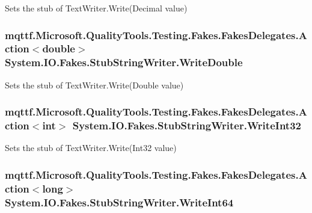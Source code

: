 Sets the stub of Text\-Writer.\-Write(\-Decimal value)

\hypertarget{class_system_1_1_i_o_1_1_fakes_1_1_stub_string_writer_a9d1b513a1d88b8f007372762f7719560}{
\subsubsection[{Write\-Double}]{\setlength{\rightskip}{0pt plus 5cm}mqttf.\-Microsoft.\-Quality\-Tools.\-Testing.\-Fakes.\-Fakes\-Delegates.\-Action$<$double$>$ System.\-I\-O.\-Fakes.\-Stub\-String\-Writer.\-Write\-Double}}\label{class_system_1_1_i_o_1_1_fakes_1_1_stub_string_writer_a9d1b513a1d88b8f007372762f7719560}


Sets the stub of Text\-Writer.\-Write(\-Double value)

\hypertarget{class_system_1_1_i_o_1_1_fakes_1_1_stub_string_writer_ac76b88364a4f21259c041c696ff246d4}{
\subsubsection[{Write\-Int32}]{\setlength{\rightskip}{0pt plus 5cm}mqttf.\-Microsoft.\-Quality\-Tools.\-Testing.\-Fakes.\-Fakes\-Delegates.\-Action$<$int$>$ System.\-I\-O.\-Fakes.\-Stub\-String\-Writer.\-Write\-Int32}}\label{class_system_1_1_i_o_1_1_fakes_1_1_stub_string_writer_ac76b88364a4f21259c041c696ff246d4}


Sets the stub of Text\-Writer.\-Write(\-Int32 value)

\hypertarget{class_system_1_1_i_o_1_1_fakes_1_1_stub_string_writer_a070f2de3d8c948fef7edd78906c6fc0c}{
\subsubsection[{Write\-Int64}]{\setlength{\rightskip}{0pt plus 5cm}mqttf.\-Microsoft.\-Quality\-Tools.\-Testing.\-Fakes.\-Fakes\-Delegates.\-Action$<$long$>$ System.\-I\-O.\-Fakes.\-Stub\-String\-Writer.\-Write\-Int64}}\label{class_system_1_1_i_o_1_1_fakes_1_1_stub_string_writer_a070f2de3d8c948fef7edd78906c6fc0c}



